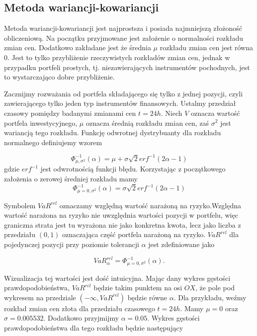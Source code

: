 \documentclass[11pt,titlepage]{article}
\numberwithin{equation}{section}
\begin{document}
\newpage


\subsection{Metoda wariancji-kowariancji}


Metoda wariancji-kowariancji jest najprostsza i posiada najmniejszą złożoność obliczeniową. Na początku przyjmowane jest założenie o normalności rozkładu zmian cen. Dodatkowo zakładane jest że średnia $\mu$ rozkładu zmian cen jest równa 0. Jest to tylko przybliżenie rzeczywistych rozkładów zmian cen, jednak w przypadku portfeli prostych, tj. niezawierających instrumentów pochodnych, jest to wystarczająco dobre przybliżenie. 

Zacznijmy rozważania od portfela składającego się tylko z jednej pozycji, czyli zawierającego tylko jeden typ instrumentów finansowych. Ustalmy przedział czasowy pomiędzy badanymi zmianami cen $t=24h$. Niech $V$ oznacza wartość portfela inwestycyjnego, $\mu$ oznacza średnią rozkładu zmian cen, zaś $\sigma^{2}$ jest wariancją tego rozkładu. Funkcję odwrotnej dystrybuanty dla rozkładu normalnego definiujemy wzorem 




\begin{equation} 
\Phi_{\mu,\sigma^{2}}^{-1}(\alpha)=\mu+\sigma \sqrt{2} erf^{-1}(2\alpha-1)
\end{equation} 
gdzie $erf^{-1}$ jest odwrotnością funkcji błędu. Korzystając z początkowego założenia o zerowej średniej rozkładu mamy
$$\Phi_{\mu=0,\sigma^{2}}^{-1}(\alpha)=\sigma \sqrt{2} erf^{-1}(2\alpha-1)$$



Symbolem $VaR^{rel}$ oznaczamy względną wartość narażoną na ryzyko.Względna wartość narażona na ryzyko nie uwzględnia wartości pozycji w portfelu, więc graniczna strata jest tu wyrażona nie jako konkretna kwota, lecz jako liczba z przedziału $(0,1)$ oznaczająca część portfela narażoną na ryzyko. $VaR^{rel}$ dla pojedynczej pozycji przy poziomie tolerancji $\alpha$ jest zdefiniowane jako

$$VaR_{\alpha}^{rel}   =\Phi_{\mu=0,\sigma^{2}}^{-1}(\alpha).$$

Wizualizacja tej wartości jest dość intuicyjna. Mając dany wykres gęstości prawdopodobieństwa, $VaR^{rel}$ będzie takim punktem na osi $OX$, że pole pod wykresem na przedziale $(-\infty,VaR^{rel})$  będzie równe $\alpha$. Dla przykładu, weźmy rozkład zmian cen złota dla przedziału czasowego $t=24h$. Mamy $\mu=0$ oraz $\sigma=0.005532$. Dodatkowo przyjmijmy $\alpha=0.05$. Wykres gęstości prawdopodobieństwa dla tego rozkładu będzie następujący
\end{document}
